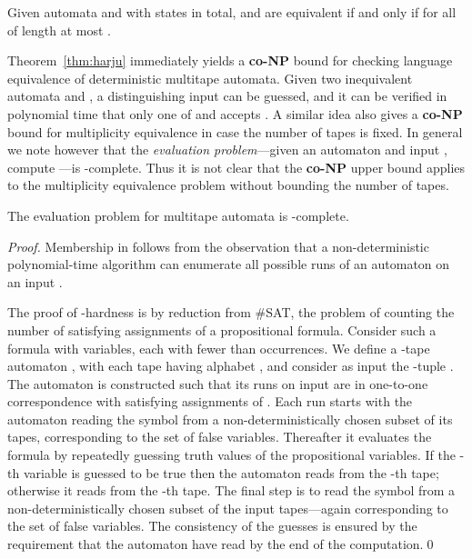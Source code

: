 \documentclass[runningheads]{llncs}
\begin{document}
\begin{theorem}
Given automata  and  with  states in total, 
and  are equivalent if and only if  for all  of
length at most .
\label{thm:harju}
\end{theorem}

Theorem~\ref{thm:harju} immediately yields a \textbf{co-NP} bound for
checking language equivalence of deterministic multitape automata.
Given two inequivalent automata  and , a distinguishing input
 can be guessed, and it can be verified in polynomial time that
only one of  and  accepts .  A similar idea also gives a
\textbf{co-NP} bound for multiplicity equivalence in case the number
of tapes is fixed.  In general we note however that the
\emph{evaluation problem}---given an automaton  and input ,
compute ---is -complete.  Thus it is not clear
that the \textbf{co-NP} upper bound applies to the multiplicity
equivalence problem without bounding the number of tapes.

\begin{proposition}
The evaluation problem for multitape automata is -complete.
\end{proposition}
\begin{proof} 
  Membership in  follows from the observation that
  a non-deterministic polynomial-time algorithm can enumerate all
  possible runs of an automaton  on an input .

  The proof of -hardness is by reduction from \#SAT, the
  problem of counting the number of satisfying assignments of a
  propositional formula.  Consider such a formula  with 
  variables, each with fewer than  occurrences.  We define a
  -tape automaton , with each tape having alphabet ,
  and consider as input the -tuple .  The
  automaton  is constructed such that its runs on input  are in
  one-to-one correspondence with satisfying assignments of .
  Each run starts with the automaton reading the symbol  from a
  non-deterministically chosen subset of its tapes, corresponding to
  the set of false variables.  Thereafter it evaluates the formula
   by repeatedly guessing truth values of the propositional
  variables.  If the -th variable is guessed to be true then the
  automaton reads  from the -th tape; otherwise it reads 
  from the -th tape.  The final step is to read the symbol  from
  a non-deterministically chosen subset of the input tapes---again
  corresponding to the set of false variables.  The consistency of the
  guesses is ensured by the requirement that the automaton have read
   by the end of the computation.\qed
\end{proof}
\end{document}

